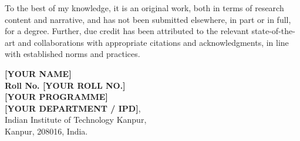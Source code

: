\documentclass[12pt, a4paper, twoside, openright]{Thesis} %
\newcommand\myemptypage{
    \null
    \thispagestyle{empty}
    \addtocounter{page}{-1}
    \newpage
    }
\begin{document}
To the best of my knowledge, it is an original work, both in terms of research content and narrative, and has not been submitted elsewhere, in part or in full, for a degree.
Further, due credit has been attributed to the relevant state-of-the-art and collaborations with appropriate citations and acknowledgments, in line with established norms and practices.
\bigskip
\bigskip
\bigskip
\bigskip

\begin{flushright}
   \vspace{2mm}
\textbf{[YOUR NAME]} \\
\textbf{Roll No. [YOUR ROLL NO.]} \\
\textbf{[YOUR PROGRAMME]}\\ 
\textbf{[YOUR DEPARTMENT / IPD]}, \\
Indian Institute of Technology Kanpur,\\
Kanpur, 208016, India.
\end{flushright}

\newpage
\myemptypage
\end{document}
